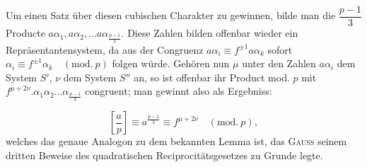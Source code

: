 Um einen Satz über diesen cubischen Charakter zu gewinnen, bilde man die
$\dfrac{p-1}{3}$ Producte $a\alpha_1, a\alpha_2, \ldots
a\alpha_{\frac{p-1}{3}}$. Diese Zahlen bilden offenbar wieder ein
Repräsentantensystem, da aus der Congruenz $a\alpha_i \equiv
f^{\pm1}a\alpha_k$ sofort $\alpha_i \equiv f^{\pm1}\alpha_k \quad(\mathrm{mod.}\ p)$
folgen würde. Gehören nun $\mu$ unter den Zahlen $a\alpha_i$ dem System
$S'$, $\nu$ dem System $S''$ an, so ist offenbar ihr Product mod. $p$ mit
$f^{\mu+2\nu}. \alpha_1\alpha_2\ldots\alpha_{\frac{p-1}{3}}$
congruent; man gewinnt also als Ergebniss:

\[
\left[\frac{a}{p}\right] \equiv a^{\frac{p-1}{3}} \equiv f^{\mu+2\nu} \quad(\mathrm{mod.}\ p),
\]
\noindent welches das genaue Analogon zu dem bekannten Lemma ist, das \textsc{Gauss} seinem
dritten Beweise des quadratischen Reciprocitätsgesetzes zu Grunde legte.

